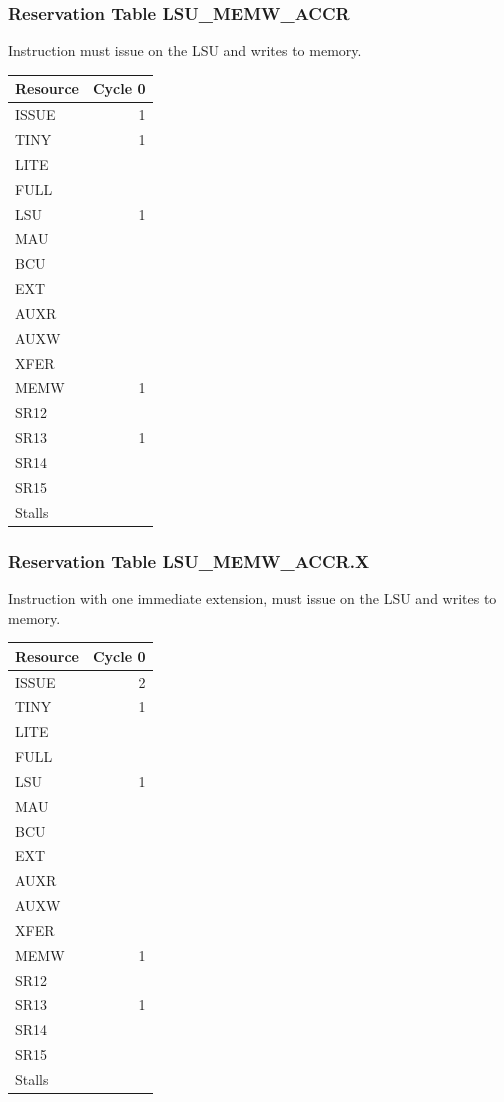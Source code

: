 \subsubsection{Reservation Table LSU\_MEMW\_ACCR} \label{sec:reservation-LSU-MEMW-ACCR}

Instruction must issue on the LSU and writes to memory.
\medskip

\begin{tabular}{|l|r|} \hline
Resource	& Cycle 0 \\ \hline
\textsf{ISSUE}	& 1	\\
\textsf{TINY}	& 1	\\
\textsf{LITE}	& 	\\
\textsf{FULL}	& 	\\
\textsf{LSU}	& 1	\\
\textsf{MAU}	& 	\\
\textsf{BCU}	& 	\\
\textsf{EXT}	& 	\\
\textsf{AUXR}	& 	\\
\textsf{AUXW}	& 	\\
\textsf{XFER}	& 	\\
\textsf{MEMW}	& 1	\\
\textsf{SR12}	& 	\\
\textsf{SR13}	& 1	\\
\textsf{SR14}	& 	\\
\textsf{SR15}	& 	\\
\hline Stalls	& 	\\
\hline \end{tabular}

\subsubsection{Reservation Table LSU\_MEMW\_ACCR.X} \label{sec:reservation-LSU-MEMW-ACCR.X}

Instruction with one immediate extension, must issue on the LSU and writes to memory.
\medskip

\begin{tabular}{|l|r|} \hline
Resource	& Cycle 0 \\ \hline
\textsf{ISSUE}	& 2	\\
\textsf{TINY}	& 1	\\
\textsf{LITE}	& 	\\
\textsf{FULL}	& 	\\
\textsf{LSU}	& 1	\\
\textsf{MAU}	& 	\\
\textsf{BCU}	& 	\\
\textsf{EXT}	& 	\\
\textsf{AUXR}	& 	\\
\textsf{AUXW}	& 	\\
\textsf{XFER}	& 	\\
\textsf{MEMW}	& 1	\\
\textsf{SR12}	& 	\\
\textsf{SR13}	& 1	\\
\textsf{SR14}	& 	\\
\textsf{SR15}	& 	\\
\hline Stalls	& 	\\
\hline \end{tabular}

